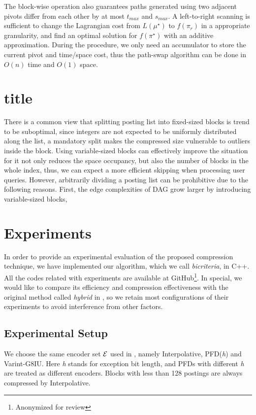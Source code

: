\documentclass{sig-alternate-05-2015}
\begin{document}
The block-wise operation also guarantees paths generated using two adjacent pivots differ from each other by at most $ t_{max} $ and $ s_{max} $.
A left-to-right scanning is sufficient to change the Lagrangian cost from $ L(\mu^\star) $ to $ f(\pi_r) $ in a appropriate granularity, and find an optimal solution for $ f(\pi^\star) $ with an additive approximation.
During the procedure, we only need an accumulator to store the current pivot and time/space cost, thus the path-swap algorithm can be done in $ O(n) $ time and $ O(1) $ space.

\section{title}\label{sec: variable_size}
There is a common view that splitting posting list into fixed-sized blocks is trend to be suboptimal, since integers are not expected to be  uniformly distributed along the list, a mandatory split makes the compressed size vulnerable to outliers inside the block.
Using variable-sized blocks can effectively improve the situation for it not only reduces the space occupancy, but also the number of blocks in the whole index, thus, we can expect a more efficient skipping when processing user queries.
However, arbitrarily dividing a posting list can be prohibitive due to the following reasons.
First, the edge complexities of DAG grow larger by introducing variable-sized blocks, 

\section{Experiments}\label{sec: experiments}
In order to provide an experimental evaluation of the proposed compression technique, we have implemented our algorithm, which we call \textit{bicriteria}, in C++.
All the codes related with experiments are available at GitHub\footnote{Anonymized for review}.
In special, we would like to compare its efficiency and compression effectiveness with the original method called \textit{hybrid} in \cite{ottaviano2015optimal}, so we retain most configurations of their experiments to avoid interference from other factors.

\subsection{Experimental Setup}
We choose the same encoder set $ \cal E $ used in \cite{ottaviano2015optimal}, namely Interpolative, PFD(\textit{h}) and Varint-G8IU.
Here \textit{h} stands for exception bit length, and PFDs with different \textit{h} are treated as different encoders.
Blocks with less than 128 postings are always compressed by Interpolative.
\end{document}
